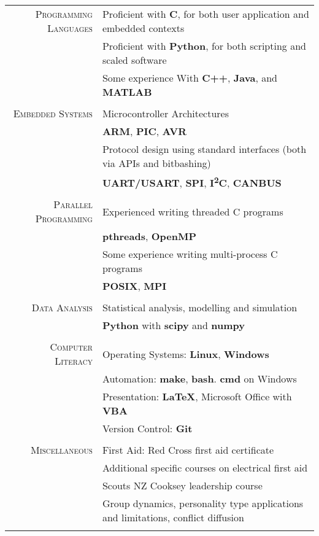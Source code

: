 \documentclass[a4paper,10pt]{article} %
\begin{document}
\begin{tabular}{r|l}
	
\textsc{Programming Languages} & Proficient with \textbf{C}, for both user application and embedded contexts \\ 
& Proficient with \textbf{Python}, for both scripting and scaled software \\
& Some experience With \textbf{C++}, \textbf{Java}, and \textbf{MATLAB} \\
\multicolumn{2}{c}{} \\

\textsc{Embedded Systems} & Microcontroller Architectures \\
& \quad \small{\textbf{ARM}, \textbf{PIC}, \textbf{AVR}} \\
& Protocol design using standard interfaces (both via APIs and bitbashing)  \\
& \quad \small{\textbf{UART/USART}, \textbf{SPI}, \textbf{I\textsuperscript{2}C}, \textbf{CANBUS}} \\
\multicolumn{2}{c}{} \\

\textsc{Parallel Programming} & Experienced writing threaded C programs \\
& \quad \small{\textbf{pthreads}, \textbf{OpenMP}} \\
& Some experience writing multi-process C programs \\
& \quad \small{\textbf{POSIX}, \textbf{MPI}} \\
\multicolumn{2}{c}{} \\

\textsc{Data Analysis} & Statistical analysis, modelling and simulation \\
& \textbf{Python} with \textbf{scipy} and \textbf{numpy} \\
\multicolumn{2}{c}{} \\

\textsc{Computer Literacy} & Operating Systems: \textbf{Linux}, \textbf{Windows} \\
& Automation: \textbf{make}, \textbf{bash}. \textbf{cmd} on Windows \\
& Presentation: \textbf{\LaTeX}, Microsoft Office with \textbf{VBA} \\
& Version Control: \textbf{Git} \\
\multicolumn{2}{c}{} \\

\textsc{Miscellaneous} & First Aid: Red Cross first aid certificate \\
& \quad \small{Additional specific courses on electrical first aid} \\
& Scouts NZ Cooksey leadership course \\
& \quad \small{Group dynamics, personality type applications and limitations, conflict diffusion} \\
\multicolumn{2}{c}{} \\

\end{tabular}
\end{document}
